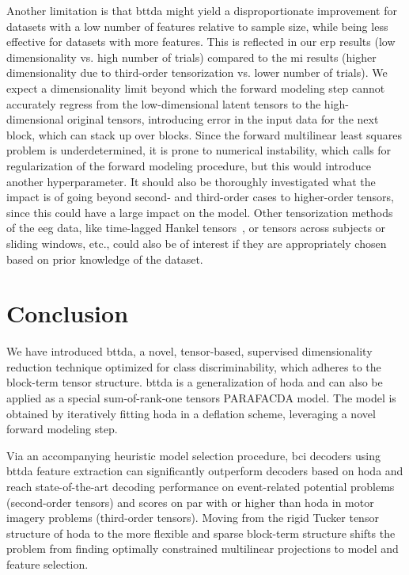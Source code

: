 \documentclass[10pt]{iopart}
\begin{document}
Another limitation is that \ac{bttda} might yield a disproportionate
improvement for datasets with a low number of features relative to sample size,
while being less effective for datasets with more features.
This is reflected in our \ac{erp} results (low dimensionality vs. high number of
trials) compared to the \ac{mi} results (higher dimensionality due to third-order
tensorization vs. lower number of trials).
We expect a dimensionality limit beyond which the forward modeling step cannot
accurately regress from the low-dimensional latent tensors to the high-
dimensional original tensors, introducing
error in the input data for the next block, which can stack up over blocks.
Since the forward multilinear least squares problem is underdetermined, it is
prone to numerical instability, which calls for regularization of the forward
modeling procedure, but this would introduce another hyperparameter.
It should also be thoroughly investigated what the impact is of going beyond
second- and third-order cases to higher-order tensors, since this could have a
large impact on the model.
Other tensorization methods of the \ac{eeg} data, like time-lagged Hankel
tensors~\cite{Papy2005}, or tensors across subjects or sliding windows, etc.,
could also be of interest if they are appropriately chosen based on prior
knowledge of the dataset.

\section{Conclusion}

We have introduced \acf{bttda}, a novel,
tensor-based, supervised dimensionality reduction technique optimized for class
discriminability, which adheres to the block-term tensor structure.
\ac{bttda} is a generalization of \acf{hoda} and can also be
applied as a special sum-of-rank-one tensors PARAFACDA model.
The model is obtained by iteratively fitting \ac{hoda} in a deflation scheme,
leveraging a novel forward modeling step.

Via an accompanying heuristic model selection procedure, \ac{bci} decoders using
\ac{bttda} feature extraction can significantly outperform decoders based on
\ac{hoda} and reach state-of-the-art decoding performance on event-related potential
problems (second-order tensors) and scores on par with or higher than \ac{hoda} in motor
imagery problems (third-order tensors).
Moving from the rigid Tucker tensor structure of \ac{hoda} to the more flexible
and sparse block-term structure shifts the problem from finding optimally constrained
multilinear projections to model and feature selection.
\end{document}

